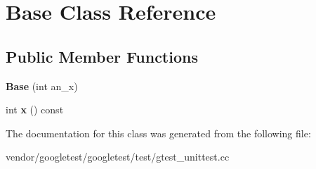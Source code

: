 \hypertarget{class_base}{}\section{Base Class Reference}
\label{class_base}
\subsection*{Public Member Functions}
\begin{DoxyCompactItemize}
\item 
\mbox{\label{class_base_a1d5f3fb92f8cbc687705785bdc6abd18}} 
{\bfseries Base} (int an\+\_\+x)
\item 
\mbox{\label{class_base_a779fd2b157ebd763b15383d96047e07c}} 
int {\bfseries x} () const
\end{DoxyCompactItemize}


The documentation for this class was generated from the following file\+:\begin{DoxyCompactItemize}
\item 
vendor/googletest/googletest/test/gtest\+\_\+unittest.\+cc\end{DoxyCompactItemize}
